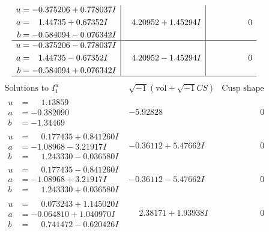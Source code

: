 \documentclass[1p]{elsarticle_modified}
\theoremstyle{definition}
\newcommand{\I}{\sqrt{-1}}
\begin{document}
$$\begin{array}{c|c|c}
\begin{aligned}
u &= -0.375206 + 0.778037 I \\
a &= \phantom{-}1.44735 + 0.67352 I \\
b &= -0.584094 - 0.076342 I\end{aligned}
 & \phantom{-}4.20952 + 1.45294 I & \phantom{-0.000000 } 0 \\ \hline\begin{aligned}
u &= -0.375206 - 0.778037 I \\
a &= \phantom{-}1.44735 - 0.67352 I \\
b &= -0.584094 + 0.076342 I\end{aligned}
 & \phantom{-}4.20952 - 1.45294 I & \phantom{-0.000000 } 0\\
 \hline 
 \end{array}$$\newpage$$\begin{array}{c|c|c}  
\text{Solutions to }I^u_{1}& \I (\text{vol} + \sqrt{-1}CS) & \text{Cusp shape}\\
 \hline 
\begin{aligned}
u &= \phantom{-}1.13859\phantom{ +0.000000I} \\
a &= -0.382090\phantom{ +0.000000I} \\
b &= -1.34469\phantom{ +0.000000I}\end{aligned}
 & -5.92828\phantom{ +0.000000I} & \phantom{-0.000000 } 0 \\ \hline\begin{aligned}
u &= \phantom{-}0.177435 + 0.841260 I \\
a &= -1.08968 - 3.21917 I \\
b &= \phantom{-}1.243330 - 0.036580 I\end{aligned}
 & -0.36112 + 5.47662 I & \phantom{-0.000000 } 0 \\ \hline\begin{aligned}
u &= \phantom{-}0.177435 - 0.841260 I \\
a &= -1.08968 + 3.21917 I \\
b &= \phantom{-}1.243330 + 0.036580 I\end{aligned}
 & -0.36112 - 5.47662 I & \phantom{-0.000000 } 0 \\ \hline\begin{aligned}
u &= \phantom{-}0.073243 + 1.145020 I \\
a &= -0.064810 + 1.040970 I \\
b &= \phantom{-}0.741472 - 0.620426 I\end{aligned}
 & \phantom{-}2.38171 + 1.93938 I & \phantom{-0.000000 } 0 \\ \hline\begin{aligned}

\end{aligned}
\end{array}$$
\end{document}
